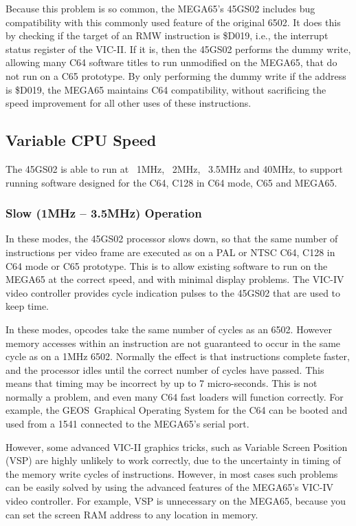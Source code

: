 Because this problem is so common, the MEGA65's 45GS02 includes bug
compatibility with this
commonly used feature of the original 6502.  It does this by checking
if the target of an RMW
instruction is \$D019, i.e., the interrupt status register of the VIC-II.
If it is, then
the 45GS02 performs the dummy write, allowing many C64 software titles
to run unmodified on the
MEGA65, that do not run on a C65 prototype.  By only performing the
dummy write if the address
is \$D019, the MEGA65 maintains C64 compatibility, without sacrificing
the speed improvement
for all other uses of these instructions.

\subsection{Variable CPU Speed}

The 45GS02 is able to run at ~1MHz, ~2MHz, ~3.5MHz and 40MHz,
to support running software
designed for the C64, C128 in C64 mode, C65 and MEGA65.

\subsubsection{Slow (1MHz -- 3.5MHz) Operation}
In these modes, the 45GS02 processor slows down, so that the same number of instructions
per video frame are executed as on a PAL or NTSC C64, C128 in C64 mode or C65 prototype.
This is to allow existing software to run on the MEGA65 at the correct speed, and with
minimal display problems.  The VIC-IV video controller provides cycle indication pulses
to the 45GS02 that are used to keep time.

In these modes, opcodes take the same number of cycles as an 6502.
However memory accesses within an
instruction are not guaranteed to occur in the same cycle as on a 1MHz 6502.  Normally
the effect is that instructions complete faster, and the processor idles until the
correct number of cycles have passed. This means that timing may be incorrect by up to
7 micro-seconds.  This is not normally a problem, and even many C64 fast loaders will
function correctly. For example, the GEOS\texttrademark \ Graphical Operating System for the C64
can be booted and used from a 1541 connected to the MEGA65's serial port.

However, some advanced VIC-II graphics tricks, such as Variable Screen
Position (VSP) are
highly unlikely to work correctly, due to the uncertainty in timing of the memory write
cycles of instructions.  However, in most cases such problems can be
easily solved by using
the advanced features of the MEGA65's VIC-IV video controller.
For example, VSP is unnecessary
on the MEGA65, because you can set the screen RAM address to any location in memory.

